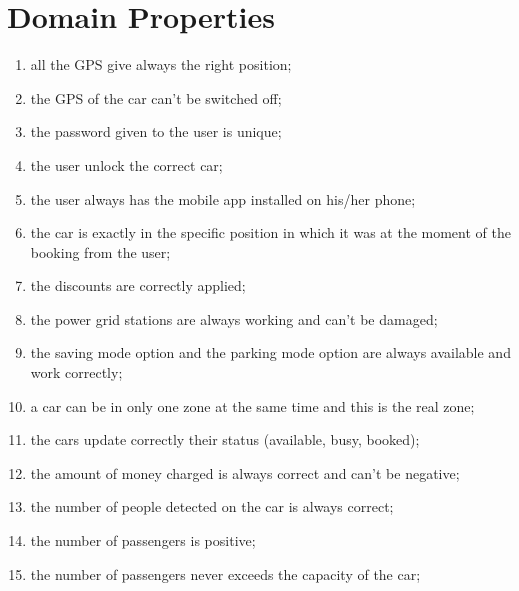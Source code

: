 \section{Domain Properties}
\begin{enumerate}
	\item all the GPS give always the right position;
	\item the GPS of the car can't be switched off;
	\item the password given to the user is unique;
	\item the user unlock the correct car;
	\item the user always has the mobile app installed on his/her phone;
	\item the car is exactly in the specific position in which it was at the moment of the booking from the user;
	\item the discounts are correctly applied;
	\item the power grid stations are always working and can't be damaged;
	\item the saving mode option and the parking mode option are always available and work correctly;
	\item a car can be in only one zone at the same time and this is the real zone;
	\item the cars update correctly their status (available, busy, booked);
    \item the amount of money charged is always correct and can't be negative;
    \item the number of people detected on the car is always correct;
    \item the number of passengers is positive;
    \item the number of passengers never exceeds the capacity of the car;

    
  
   
    
\end{enumerate}
